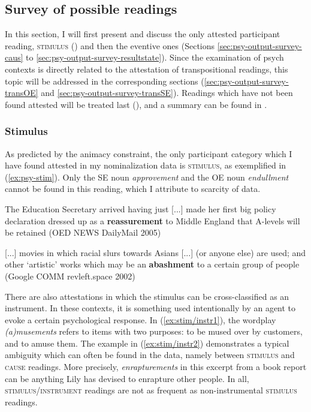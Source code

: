 \subsection{Survey of possible readings}
\label{sec:psy-output-survey}

In this section, I will first present and discuss the only attested participant reading, \textsc{stimulus} () and then the eventive ones (Sections \ref{sec:psy-output-survey-caus} to \ref{sec:psy-output-survey-resultstate}). Since the examination of psych contexts is directly related to the attestation of transpositional readings, this topic will be addressed in the corresponding sections (\ref{sec:psy-output-survey-transOE} and \ref{sec:psy-output-survey-transSE}).
Readings which have not been found attested will be treated last (), and a summary can be found in .

\subsubsection{Stimulus}
\label{sec:psy-output-survey-stim}

As predicted by the animacy constraint, the only participant category which I have found attested in my nominalization data is \textsc{stimulus}, as exemplified in (\ref{ex:psy-stim}). Only the SE noun \textit{approvement} and the OE noun \textit{endullment} cannot be found in this reading, which I attribute to scarcity of data. 

\begin{exe}
	\ex \label{ex:psy-stim}
	\begin{xlist}
		\item \label{ex:psy-stim1} The Education Secretary arrived having just [...] made her first big policy declaration \textendash{} dressed up as a \textbf{reassurement} to Middle England that A-levels will be retained 
		{\small(\acs{OED} NEWS DailyMail 2005)}
		\item \label{ex:psy-stim2} [...] movies in which racial slurs towards Asians [...] (or anyone else) are used; and other `artistic' works which may be an \textbf{abashment} to a certain group of people 
		{\small(Google COMM revleft.space 2002)}
	\end{xlist}
\end{exe}

\noindent There are also attestations in which the stimulus can be cross-classified as an instrument. In these contexts, it is something used intentionally by an agent to evoke a certain psychological response. In (\ref{ex:stim/instr1}), the wordplay \textit{(a)musements} refers to items with two purposes: to be mused over by customers, and to amuse them. The example in (\ref{ex:stim/instr2}) demonstrates a typical ambiguity which can often be found in the data, namely between \textsc{stimulus} and \textsc{cause} readings. More precisely, \textit{enrapturements} in this excerpt from a book report can be anything Lily has devised to enrapture other people. In all, \textsc{stimulus/instrument} readings are not as frequent as non-instrumental \textsc{stimulus} readings. 

